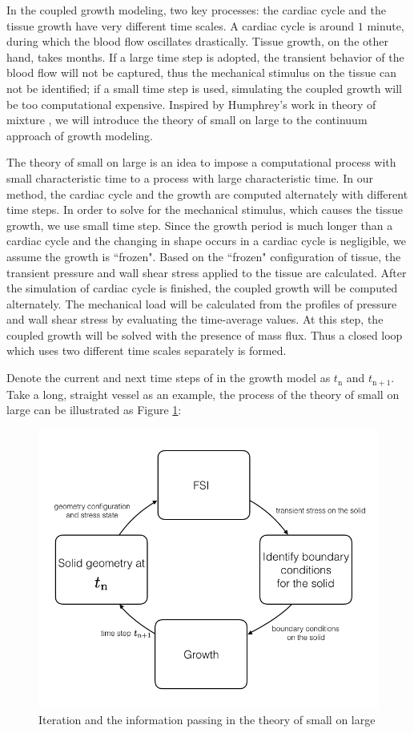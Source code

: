 In the coupled growth modeling, two key processes: the cardiac cycle and the tissue growth have very different time scales. A cardiac cycle is around $1$ minute, during which the blood flow oscillates drastically. Tissue growth, on the other hand, takes months. If a large time step is adopted, the transient behavior of the blood flow will not be captured, thus the mechanical stimulus on the tissue can not be identified; if a small time step is used, simulating the coupled growth will be too computational expensive. Inspired by Humphrey's work in theory of mixture \cite{Baek}, we will introduce the theory of small on large to the continuum approach of growth modeling.

The theory of small on large is an idea to impose a computational process with small characteristic time to a process with large characteristic time. In our method, the cardiac cycle and the growth are computed alternately with different time steps. In order to solve for the mechanical stimulus, which causes the tissue growth, we use small time step. Since the growth period is much longer than a cardiac cycle and the changing in shape occurs in a cardiac cycle is negligible, we assume the growth is ``frozen". Based on the ``frozen" configuration of tissue, the transient pressure and wall shear stress applied to the tissue are calculated. After the simulation of cardiac cycle is finished, the coupled growth will be computed alternately. The mechanical load will be calculated from the profiles of pressure and wall shear stress by evaluating the time-average values. At this step, the coupled growth will be solved with the presence of mass flux. Thus a closed loop which uses two different time scales separately is formed.

Denote the current and next time steps of in the growth model as $t_\mathrm{n}$ and $t_\mathrm{n+1}$. Take a long, straight vessel as an example, the process of the theory of small on large can be illustrated as Figure \ref{fig:smallOnLarge}:
\begin{figure}[H]
   \centering
   \includegraphics[width=.4\textwidth]{./figs/smallOnLarge.png} %
   \caption{Iteration and the information passing in the theory of small on large}
   \label{fig:smallOnLarge}
\end{figure}

